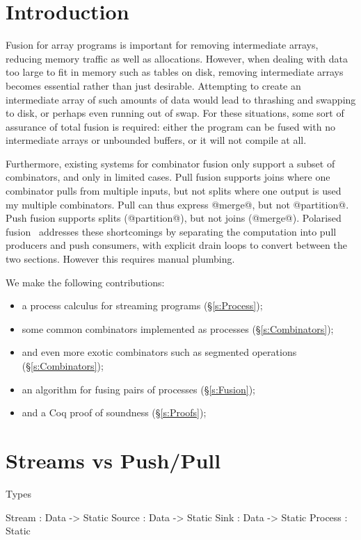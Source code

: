 \section{Introduction}
\label{s:Introduction}

Fusion for array programs is important for removing intermediate arrays, reducing memory traffic as well as allocations.
However, when dealing with data too large to fit in memory such as tables on disk, removing intermediate arrays becomes essential rather than just desirable.
Attempting to create an intermediate array of such amounts of data would lead to thrashing and swapping to disk, or perhaps even running out of swap.
For these situations, some sort of assurance of total fusion is required: either the program can be fused with no intermediate arrays or unbounded buffers, or it will not compile at all.

Furthermore, existing systems for combinator fusion only support a subset of combinators, and only in limited cases.
Pull fusion supports joins where one combinator pulls from multiple inputs, but not splits where one output is used my multiple combinators.
Pull can thus express @merge@, but not @partition@.
Push fusion supports splits (@partition@), but not joins (@merge@).
Polarised fusion~\cite{lippmeier2016polarized} addresses these shortcomings by separating the computation into pull producers and push consumers, with explicit drain loops to convert between the two sections. However this requires manual plumbing.

We make the following contributions:
\begin{itemize}
\item a process calculus for streaming programs (\S\ref{s:Process});
\item some common combinators implemented as processes (\S\ref{s:Combinators});
\item and even more exotic combinators such as segmented operations (\S\ref{s:Combinators});
\item an algorithm for fusing pairs of processes (\S\ref{s:Fusion});
\item and a Coq proof of soundness (\S\ref{s:Proofs});
\end{itemize}

\section{Streams vs Push/Pull}

Types
\begin{code}
Stream  : Data -> Static
Source  : Data -> Static
Sink    : Data -> Static
Process :         Static
\end{code}

